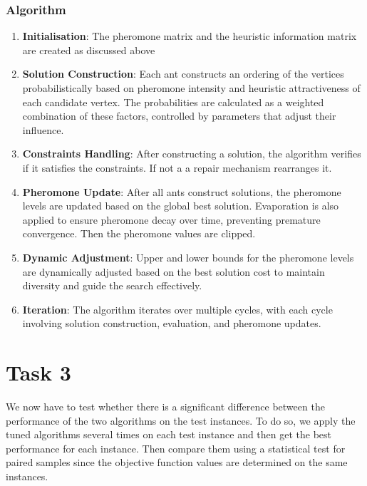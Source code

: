 \documentclass{article}
\begin{document}
\subsubsection*{Algorithm}
\begin{enumerate}
    \item \textbf{Initialisation}: The pheromone matrix and the heuristic information matrix are created as discussed above
    \item \textbf{Solution Construction}: Each ant constructs an ordering of the vertices probabilistically based on pheromone intensity and heuristic attractiveness of each candidate vertex. The probabilities are calculated as a weighted combination of these factors, controlled by parameters that adjust their influence.
    \item \textbf{Constraints Handling}: After constructing a solution, the algorithm verifies if it satisfies the constraints. If not a a repair mechanism rearranges it.
    \item \textbf{Pheromone Update}: After all ants construct solutions, the pheromone levels are updated based on the global best solution. Evaporation is also applied to ensure pheromone decay over time, preventing premature convergence. Then the pheromone values are clipped.
    \item \textbf{Dynamic Adjustment}: Upper and lower bounds for the pheromone levels are dynamically adjusted based on the best solution cost to maintain diversity and guide the search effectively.
    \item \textbf{Iteration}: The algorithm iterates over multiple cycles, with each cycle involving solution construction, evaluation, and pheromone updates.

\end{enumerate}



\section{Task 3}

We now have to test whether there is a significant difference between the performance of the two algorithms on the test instances. To do so, we apply the tuned algorithms several times on each test instance and then get the best performance for each instance. Then compare them using a statistical test for paired samples since the objective function values are determined on the same instances. 
\end{document}
